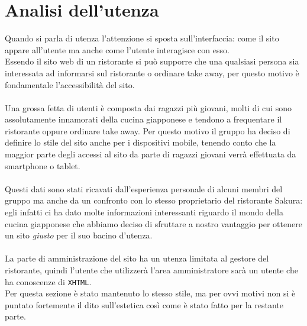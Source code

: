 \documentclass[../relazione.tex]{subfiles}
\begin{document}
\section{Analisi dell'utenza}
		Quando si parla di utenza l'attenzione si sposta sull'interfaccia: come il sito appare all'utente ma anche come l'utente interagisce con esso.\\
		Essendo il sito web di un ristorante si può supporre che una qualsiasi persona sia interessata ad informarsi sul ristorante o ordinare take away, per questo motivo è fondamentale l'accessibilità del sito.\\\\
		Una grossa fetta di utenti è composta dai ragazzi più giovani, molti di cui sono assolutamente innamorati della cucina giapponese e tendono a frequentare il ristorante oppure ordinare take away.
		Per questo motivo il gruppo ha deciso di definire lo stile del sito anche per i dispositivi mobile, tenendo conto che la maggior parte degli accessi al sito da parte di ragazzi giovani verrà effettuata da smartphone o tablet.\\\\
		Questi dati sono stati ricavati dall'esperienza personale di alcuni membri del gruppo ma anche da un confronto con lo stesso proprietario del ristorante Sakura: egli infatti ci ha dato molte informazioni interessanti riguardo il mondo della cucina giapponese che abbiamo deciso di sfruttare a nostro vantaggio per ottenere un sito \textit{giusto} per il suo bacino d'utenza.\\\\
		La parte di amministrazione del sito ha un utenza limitata al gestore del ristorante, quindi l'utente che utilizzerà l'area amministratore sarà un utente che ha conoscenze di \texttt{XHTML}.\\
		Per questa sezione è stato mantenuto lo stesso stile, ma per ovvi motivi non si è puntato fortemente il dito sull'estetica così come è stato fatto per la restante parte. 
\end{document}

